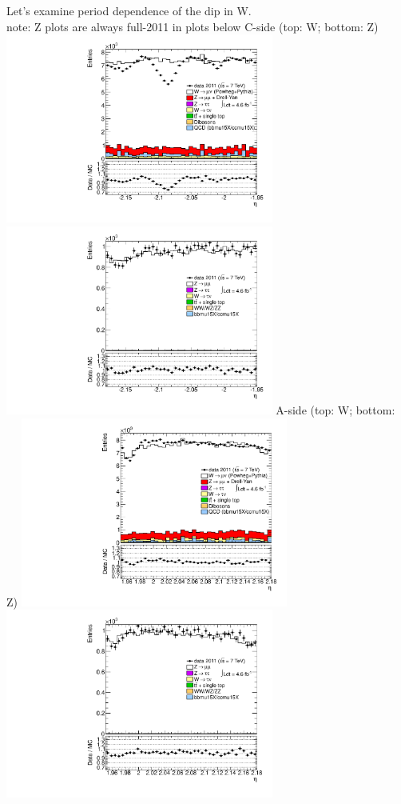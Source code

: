  {
Let's examine period dependence of the dip in W. \\
\small{ note: Z plots are always full-2011 in plots below }
}
 {
\colb[T]
C-side (top: W; bottom: Z)
\centering
\includegraphics[width=0.66\textwidth]{dates/20130306/figures/etaphi/W_10_C_stack_l_eta_NEG} \\
\includegraphics[width=0.66\textwidth]{dates/20130306/figures/etaphi/Z_10_C_stack_lN_eta_ALL.pdf}
A-side (top: W; bottom: Z)
\centering
\includegraphics[width=0.66\textwidth]{dates/20130306/figures/etaphi/W_10_A_stack_l_eta_NEG} \\
\includegraphics[width=0.66\textwidth]{dates/20130306/figures/etaphi/Z_10_A_stack_lN_eta_ALL.pdf} 
\cole
}
